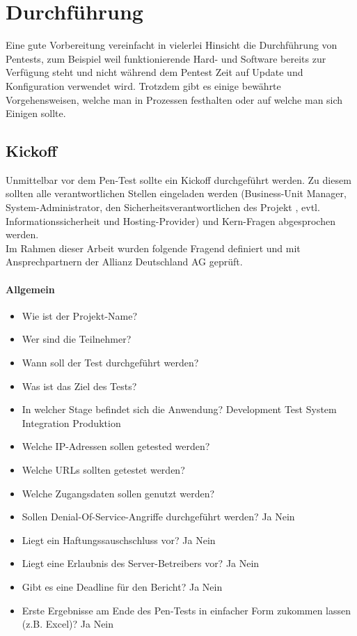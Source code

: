 \section{Durchführung}
Eine gute Vorbereitung vereinfacht in vielerlei Hinsicht die Durchführung von Pentests, zum Beispiel weil funktionierende Hard- und Software bereits zur Verfügung steht und nicht während dem Pentest Zeit auf Update und Konfiguration verwendet wird. Trotzdem gibt es einige bewährte Vorgehensweisen, welche man in Prozessen festhalten oder auf welche man sich Einigen sollte. 

	\subsection{Kickoff}
	Unmittelbar vor dem Pen-Test sollte ein Kickoff durchgeführt werden. Zu diesem sollten alle verantwortlichen Stellen eingeladen werden (Business-Unit Manager, System-Administrator, den Sicherheitsverantwortlichen des Projekt , evtl. Informationssicherheit und Hosting-Provider) und Kern-Fragen abgesprochen werden.\\
	
	Im Rahmen dieser Arbeit wurden folgende Fragend definiert und mit Ansprechpartnern der Allianz Deutschland AG geprüft.
			
\paragraph{Allgemein}
\begin{itemize}
	\item Wie ist der Projekt-Name?
	\item Wer sind die Teilnehmer?
	\item Wann soll der Test durchgeführt werden?
	\item Was ist das Ziel des Tests?
	\item In welcher Stage befindet sich die Anwendung? Development Test System Integration Produktion
	\item Welche IP-Adressen sollen getested werden?
	\item Welche URLs sollten getestet werden?
	\item Welche Zugangsdaten sollen genutzt werden?
	\item Sollen Denial-Of-Service-Angriffe durchgeführt werden? Ja Nein
	\item Liegt ein Haftungssauschschluss vor? Ja Nein
	\item Liegt eine Erlaubnis des Server-Betreibers vor? Ja Nein
	\item Gibt es eine Deadline für den Bericht? Ja Nein
	\item Erste Ergebnisse am Ende des Pen-Tests in einfacher Form zukommen lassen (z.B. Excel)? Ja Nein
\end{itemize}


